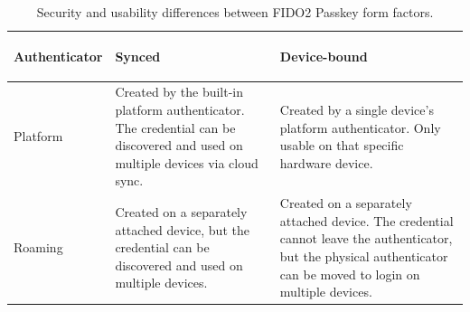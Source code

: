 \documentclass{article}
\begin{document}
\begin{table}[htbp]
    \centering
    \renewcommand{\arraystretch}{1.5} 
    \caption{Security and usability differences between FIDO2 Passkey form factors.}
    \label{tab:passkey_form_factors}
    \begin{tabularx}{\textwidth}{
        >{\bfseries\raggedright\arraybackslash}m{2.8cm} %
        >{\raggedright\arraybackslash}X               %
        >{\raggedright\arraybackslash}X               %
    }
        \toprule
        Authenticator & \textbf{Synced} & \textbf{Device-bound} \\
        \midrule
        
        Platform & Created by the built-in platform authenticator. The credential can be discovered and used on multiple devices via cloud sync. & Created by a single device's platform authenticator. Only usable on that specific hardware device. \\
        
        \arrayrulecolor{gray!40}\midrule\arrayrulecolor{black} 
        
        Roaming & Created on a separately attached device, but the credential can be discovered and used on multiple devices. & Created on a separately attached device. The credential cannot leave the authenticator, but the physical authenticator can be moved to login on multiple devices. \\
        
        \bottomrule
    \end{tabularx}
\end{table}
\end{document}
